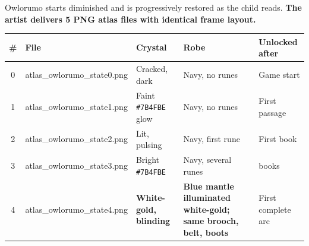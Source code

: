 \documentclass[11pt, a4paper]{article}
\newcommand{\hex}[1]{\textcolor[HTML]{#1}{\texttt{\##1}}}
\begin{document}
Owlorumo starts diminished and is progressively restored as the child reads.
\textbf{The artist delivers 5 PNG atlas files with identical frame layout.}

\vspace{6pt}
\begin{tabularx}{\textwidth}{@{}c >{\ttfamily\small}l >{\raggedright\arraybackslash}X
    >{\raggedright\arraybackslash}X >{\raggedright\arraybackslash}X@{}}
  \toprule
  \rowcolor{tabhead}
  \color{white}\sffamily\bfseries \# &
  \color{white}\sffamily\bfseries File &
  \color{white}\sffamily\bfseries Crystal &
  \color{white}\sffamily\bfseries Robe &
  \color{white}\sffamily\bfseries Unlocked after \\
  \midrule
  \rowcolor{tabrow}0 & atlas\_owlorumo\_state0.png & Cracked, dark & Navy, no runes & Game start \\
  1 & atlas\_owlorumo\_state1.png & Faint \hex{7B4FBE} glow & Navy, no runes & First passage \\
  \rowcolor{tabrow}2 & atlas\_owlorumo\_state2.png & Lit, pulsing & Navy, first rune & First book \\
  3 & atlas\_owlorumo\_state3.png & Bright \hex{7B4FBE} & Navy, several runes & 3 books \\
  \rowcolor{tabrow}4 & atlas\_owlorumo\_state4.png & \textbf{White-gold, blinding} & \textbf{Blue mantle illuminated white-gold; same brooch, belt, boots} & First complete arc \\
  \bottomrule
\end{tabularx}
\end{document}
